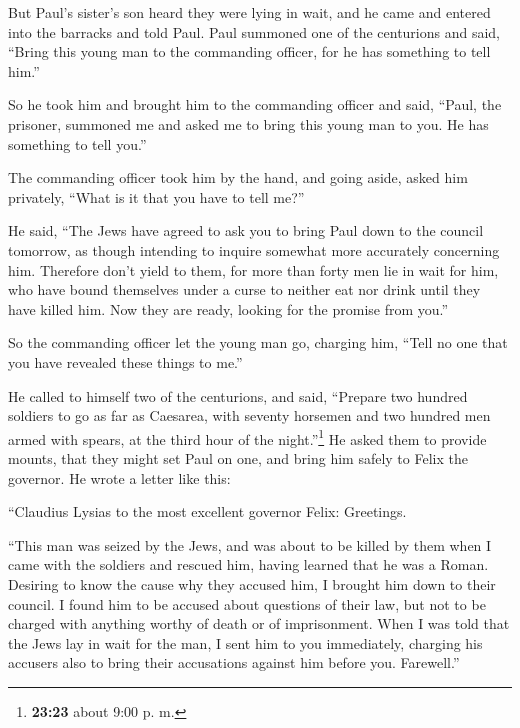  But Paul's sister's son heard they were lying in wait,
and he came and entered into the barracks and told Paul. 
Paul summoned one of the centurions and said, ``Bring this young man to
the commanding officer, for he has something to tell him.''

 So he took him and brought him to the commanding officer
and said, ``Paul, the prisoner, summoned me and asked me to bring this
young man to you. He has something to tell you.''

 The commanding officer took him by the hand, and going
aside, asked him privately, ``What is it that you have to tell me?''

 He said, ``The Jews have agreed to ask you to bring Paul
down to the council tomorrow, as though intending to inquire somewhat
more accurately concerning him.  Therefore don't yield to
them, for more than forty men lie in wait for him, who have bound
themselves under a curse to neither eat nor drink until they have killed
him. Now they are ready, looking for the promise from you.''

 So the commanding officer let the young man go, charging
him, ``Tell no one that you have revealed these things to me.''

 He called to himself two of the centurions, and said,
``Prepare two hundred soldiers to go as far as Caesarea, with seventy
horsemen and two hundred men armed with spears, at the third hour of the
night.''\footnote{\textbf{23:23} about 9:00 p. m.}  He
asked them to provide mounts, that they might set Paul on one, and bring
him safely to Felix the governor.  He wrote a letter like
this:

 ``Claudius Lysias to the most excellent governor Felix:
Greetings.

 ``This man was seized by the Jews, and was about to be
killed by them when I came with the soldiers and rescued him, having
learned that he was a Roman.  Desiring to know the cause
why they accused him, I brought him down to their council.
 I found him to be accused about questions of their law,
but not to be charged with anything worthy of death or of imprisonment.
 When I was told that the Jews lay in wait for the man, I
sent him to you immediately, charging his accusers also to bring their
accusations against him before you. Farewell.''

